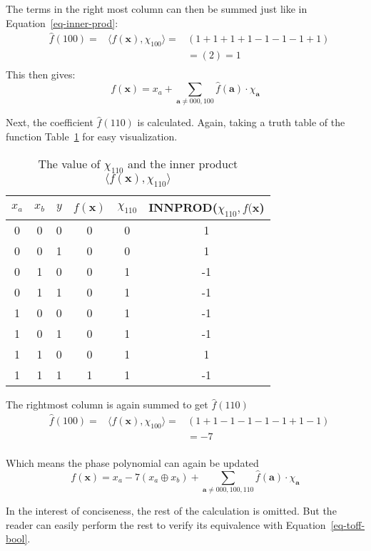 \documentclass[a4paper]{article}
\begin{document}
\begin{example}
  
  The terms in the right most column can then be summed just like in Equation~\ref{eq-inner-prod}:
  \begin{align}
      &\hat{f}(100) = &\langle f(\mathbf{x}), \chi_{100} \rangle = &( 1 + 1 + 1 + 1 - 1 - 1 - 1 + 1) \\\nonumber
      &&& = ( 2 ) = 1\nonumber\\\nonumber
  \end{align}
  This then gives:
  \begin{equation}
    f(\mathbf{x}) = x_a + \sum_{\mathbf{a} \neq 000,100} \hat{f}(\mathbf{a}) \cdot \chi_{\mathbf{a}}
  \end{equation}

  Next, the coefficient $\hat{f}(110)$ is calculated. Again, taking a truth table of the function
  Table~\ref{table-ex-110} for easy visualization.

  \begin{table}[h]
    \begin{center}
      \begin{tabular}{c|c|c|c|c|c}
        $x_a$ & $x_b$ & $y$ & $f(\mathbf{x})$ & $\chi_{110}$ & INNPROD($\chi_{110},f(\mathbf{x}$) \\\hline
        0 & 0 & 0 & 0 & 0 & 1\\\hline
        0 & 0 & 1 & 0 & 0 & 1\\\hline
        0 & 1 & 0 & 0 & 1 & -1\\\hline
        0 & 1 & 1 & 0 & 1 & -1\\\hline
        1 & 0 & 0 & 0 & 1 & -1\\\hline
        1 & 0 & 1 & 0 & 1 & -1\\\hline
        1 & 1 & 0 & 0 & 1 & 1\\\hline      
        1 & 1 & 1 & 1 & 1 & -1\\\hline
      \end{tabular}
      \caption{The value of $\chi_{110}$ and the inner product $\langle f(\mathbf{x}), \chi_{110} \rangle$}
      \label{table-ex-110}
    \end{center}
  \end{table}
  The rightmost column is again summed to get $\hat{f}(110)$
  \begin{align}
      &\hat{f}(100) = &\langle f(\mathbf{x}), \chi_{100} \rangle = & ( 1 + 1 - 1 - 1 - 1 - 1 + 1 - 1) \\\nonumber
      &&& = -7\nonumber\\\nonumber
  \end{align}

  Which means the phase polynomial can again be updated
  \begin{equation}
    f(\mathbf{x}) = x_a - 7 (x_a \oplus x_b) + \sum_{\mathbf{a} \neq 000,100,110} \hat{f}(\mathbf{a}) \cdot \chi_{\mathbf{a}}
  \end{equation}

  In the interest of conciseness, the rest of the calculation is omitted. But the reader can easily perform the
  rest to verify its equivalence with Equation~\ref{eq-toff-bool}.
\end{example}
\end{document}
